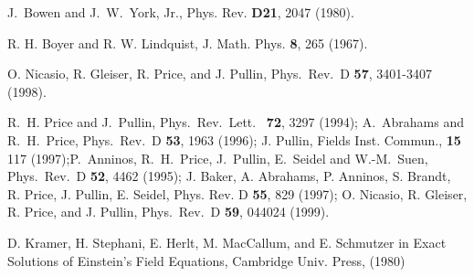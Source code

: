 \begin{references}
J.~Bowen and J.~W.~York, Jr., Phys. Rev. 
{\bf D21}, 2047 (1980).



R. H. Boyer and R. W. Lindquist, J. Math. Phys. {\bf8}, 265 (1967).

 O. Nicasio, R. Gleiser, R. Price, 
and J. Pullin, Phys.\ Rev.\ D {\bf 57}, 3401-3407 (1998).




 R.~H. Price and J.~Pullin, Phys.\ Rev.\ Lett.\ {\bf
    72}, 3297 (1994); A.~Abrahams and R.~H.~Price, Phys.\ Rev.\ D {\bf
    53}, 1963 (1996); J. Pullin, Fields Inst. Commun., {\bf 15} 117
    (1997);P.~Anninos, R.~H.~Price, J.~Pullin, E.~Seidel and
    W.-M.~Suen, Phys.\ Rev.\ D {\bf 52}, 4462 (1995); J. Baker,
    A. Abrahams, P. Anninos, S.  Brandt, R.  Price, J. Pullin,
    E. Seidel, Phys. Rev. D {\bf 55}, 829 (1997); O. Nicasio,
    R. Gleiser, R. Price, and J. Pullin, Phys.\ Rev.\ D {\bf 59},
    044024 (1999).



 D. Kramer, H. Stephani, E. Herlt, M. MacCallum, and
E. Schmutzer in Exact Solutions of Einstein's Field Equations,
Cambridge Univ. Press, (1980)
\end{references}







